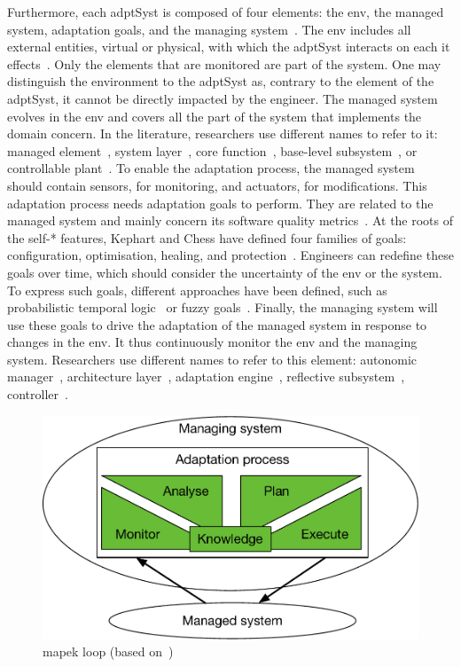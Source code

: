 Furthermore, each \gls{adptSyst} is composed of four elements: the \gls{env}, the managed system, adaptation goals, and the managing system~\cite{DBLP:books/sp/19/Weyns19}.
The \gls{env} includes all external entities, virtual or physical, with which the \gls{adptSyst} interacts on each it effects~\cite{DBLP:journals/ansoft/Jackson97}.
Only the elements that are monitored are part of the system.
One may distinguish the environment to the \gls{adptSyst} as, contrary to the element of the \gls{adptSyst}, it cannot be directly impacted by the engineer.
The managed system evolves in the \gls{env} and covers all the part of the system that implements the domain concern.
In the literature, researchers use different names to refer to it: managed element~\cite{DBLP:journals/computer/KephartC03}, system layer~\cite{DBLP:journals/computer/GarlanCHSS04}, core function~\cite{DBLP:journals/taas/SalehieT09}, base-level subsystem~\cite{DBLP:journals/taas/WeynsMA12}, or controllable plant~\cite{DBLP:conf/icse/FilieriHM14}.
To enable the adaptation process, the managed system should contain sensors, for monitoring, and actuators, for modifications.
This adaptation process needs adaptation goals to perform.
They are related to the managed system and mainly concern its software quality metrics~\cite{DBLP:conf/ecsa/WeynsA13}.
At the roots of the self-* features, Kephart and Chess have defined four families of goals: configuration, optimisation, healing, and protection~\cite{DBLP:journals/computer/KephartC03}.  
Engineers can redefine these goals over time, which should consider the uncertainty of the \gls{env} or the system.
To express such goals, different approaches have been defined, such as probabilistic temporal logic~\cite{DBLP:journals/tse/CalinescuGKMT11} or fuzzy goals~\cite{DBLP:conf/re/BaresiPS10}.
Finally, the managing system will use these goals to drive the adaptation of the managed system in response to changes in the \gls{env}.
It thus continuously monitor the \gls{env} and the managing system.
Researchers use different names to refer to this element: autonomic manager~\cite{DBLP:journals/computer/KephartC03}, architecture layer~\cite{DBLP:journals/computer/GarlanCHSS04}, adaptation engine~\cite{DBLP:journals/taas/SalehieT09}, reflective subsystem~\cite{DBLP:journals/taas/WeynsMA12}, controller~\cite{DBLP:conf/icse/FilieriHM14}.

\begin{figure}
	\centering
	\includegraphics[width=0.6\linewidth]{img/chapt-background/adptSyst/mapek}
	\caption{\gls{mapek} loop (based on~\cite{DBLP:journals/computer/KephartC03})}
	\label{fig:background:adptSyst:principles:mapek}
\end{figure}

